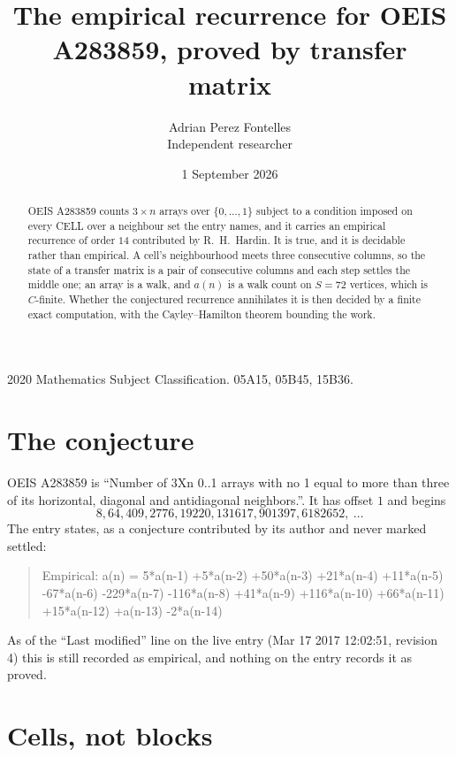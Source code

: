 \documentclass[11pt,a4paper]{article}
\title{The empirical recurrence for OEIS A283859, proved by transfer matrix}
\author{Adrian Perez Fontelles\\ \small Independent researcher}
\date{1 September 2026}
\theoremstyle{plain}
\theoremstyle{definition}
\begin{document}
\maketitle

\begin{abstract}
OEIS A283859 counts $3\times n$ arrays over $\{0,\dots,1\}$ subject to a condition imposed on
every CELL over a neighbour set the entry names, and it carries an empirical recurrence of
order $14$ contributed by R.~H.~Hardin. It is true, and it is decidable rather than
empirical. A cell's neighbourhood meets three consecutive columns, so the state of a transfer
matrix is a pair of consecutive columns and each step settles the middle one; an array is a
walk, and $a(n)$ is a walk count on $S=72$ vertices, which is $C$-finite. Whether the
conjectured recurrence annihilates it is then decided by a finite exact computation, with the
Cayley--Hamilton theorem bounding the work.
\end{abstract}

\noindent\small 2020 Mathematics Subject Classification. 05A15, 05B45, 15B36.\normalsize

\section{The conjecture}

OEIS A283859 is ``Number of 3Xn 0..1 arrays with no 1 equal to more than three of its horizontal, diagonal and antidiagonal neighbors.''. It has offset $1$ and begins
\[
8, 64, 409, 2776, 19220, 131617, 901397, 6182652,\ \dots
\]
The entry states, as a conjecture contributed by its author and never marked settled:
\begin{quote}
Empirical: a(n) = 5*a(n-1) +5*a(n-2) +50*a(n-3) +21*a(n-4) +11*a(n-5) -67*a(n-6) -229*a(n-7) -116*a(n-8) +41*a(n-9) +116*a(n-10) +66*a(n-11) +15*a(n-12) +a(n-13) -2*a(n-14)
\end{quote}
As of the ``Last modified'' line on the live entry (Mar 17 2017 12:02:51, revision 4) this is still
recorded as empirical, and nothing on the entry records it as proved.

\section{Cells, not blocks}
\end{document}
